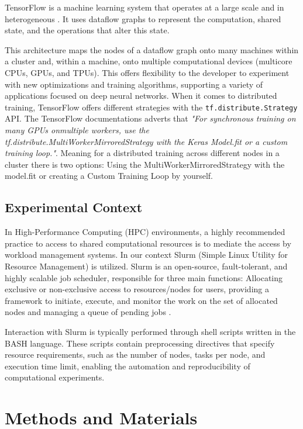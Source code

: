 \documentclass[format=acmsmall, review=false, screen=true]{acmart}
\begin{document}
TensorFlow is a machine learning system that operates at a large scale
and in heterogeneous \cite{tensorflow2016}. It uses dataflow graphs to
represent the computation, shared state, and the operations that alter
this state.

This architecture maps the nodes of a dataflow graph onto many
machines within a cluster and, within a machine, onto multiple
computational devices (multicore CPUs, GPUs, and TPUs). This offers
flexibility to the developer to experiment with new optimizations and
training algorithms, supporting a variety of applications focused on
deep neural networks. When it comes to distributed training, TensorFlow offers different
strategies with the \texttt{tf.distribute.Strategy} API. The TensorFlow
documentations adverts that \emph{"For synchronous training on many GPUs
onmultiple workers, use the tf.distribute.MultiWorkerMirroredStrategy with the Keras Model.fit or a custom training loop."}\cite{distributed}. Meaning for a
distributed training across different nodes in a cluster there is two
options: Using the MultiWorkerMirroredStrategy with the model.fit or
creating a Custom Training Loop by yourself.

\subsection{Experimental Context}
\label{sec:orgce4c8b9}
In High-Performance Computing (HPC) environments, a highly recommended
practice to access to shared computational resources is to mediate the
access by workload management systems. In our context Slurm (Simple
Linux Utility for Resource Management) is utilized. Slurm is an
open-source, fault-tolerant, and highly scalable job scheduler,
responsible for three main functions: Allocating exclusive or
non-exclusive access to resources/nodes for users, providing a
framework to initiate, execute, and monitor the work on the set of
allocated nodes and managing a queue of pending jobs \cite{yoo2003slurm}.

Interaction with Slurm is typically performed through shell scripts
written in the BASH language. These scripts contain preprocessing
directives that specify resource requirements, such as the number of
nodes, tasks per node, and execution time limit, enabling the
automation and reproducibility of computational experiments.

\section{Methods and Materials}
\label{sec:org88eb420}
\end{document}
